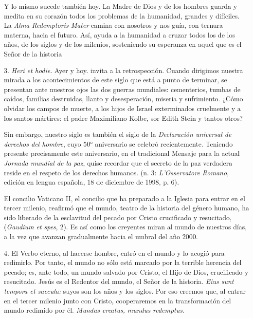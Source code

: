 Y lo mismo sucede también hoy. La Madre de Dios y de los hombres guarda y medita en su corazón todos los problemas de la humanidad, grandes y difíciles. La \emph{Alma Redemptoris Mater} camina con nosotros y nos guía, con ternura materna, hacia el futuro. Así, ayuda a la humanidad a cruzar todos los  de los años, de los siglos y de los milenios, sosteniendo su esperanza en aquel que es el Señor de la historia

3. \emph{Heri et hodie}. Ayer y hoy.  invita a la retrospección. Cuando dirigimos nuestra mirada a los acontecimientos de este siglo que está a punto de terminar, se presentan ante nuestros ojos las dos guerras mundiales: cementerios, tumbas de caídos, familias destruidas, llanto y desesperación, miseria y sufrimiento. ¿Cómo olvidar los campos de muerte, a los hijos de Israel exterminados cruelmente y a los santos mártires: el padre Maximiliano Kolbe, sor Edith Stein y tantos otros?

Sin embargo, nuestro siglo es también el siglo de la \emph{Declaración universal de derechos del hombre}, cuyo 50° aniversario se celebró recientemente. Teniendo presente precisamente este aniversario, en el tradicional Mensaje para la actual \emph{Jornada mundial de la paz}, quise recordar que el secreto de la paz verdadera reside en el respeto de los derechos humanos.  (n. 3: \emph{L'Osservatore Romano}, edición en lengua española, 18 de diciembre de 1998, p. 6).

El concilio Vaticano II, el concilio que ha preparado a la Iglesia para entrar en el tercer milenio, reafirmó que el mundo, teatro de la historia del género humano, ha sido liberado de la esclavitud del pecado por Cristo crucificado y resucitado,  (\emph{Gaudium et spes}, 2). Es así como los creyentes miran al mundo de nuestros días, a la vez que avanzan gradualmente hacia el umbral del año 2000.

4. El Verbo eterno, al hacerse hombre, entró en el mundo y lo acogió para redimirlo. Por tanto, el mundo no sólo está marcado por la terrible herencia del pecado; es, ante todo, un mundo salvado por Cristo, el Hijo de Dios, crucificado y resucitado. Jesús es el Redentor del mundo, el Señor de la historia. \emph{Eius sunt tempora et saecula:} suyos son los años y los siglos. Por eso creemos que, al entrar en el tercer milenio junto con Cristo, cooperaremos en la transformación del mundo redimido por él. \emph{Mundus creatus, mundus redemptus}.

